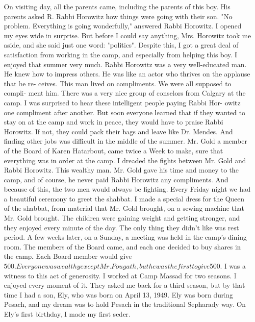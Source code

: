  
On visiting day, all the parents came, including the parents of 
this boy.
His parents asked R. Rabbi Horowitz how things were going with their son.
"No problem.
Everything is going wonderfully," answered Rabbi Horowitz.
I opened my eyes wide in surprise.
But before I could say anything, Mrs.
Horowitz took me aside, and she said just one word: "politics".
Despite this, I got a great deal of satisfaction from working in 
the camp, and especially from helping this boy.
I enjoyed that summer 
very much.
Rabbi Horowitz was a very well-educated man.
He knew how to impress 
others.
He was like an actor who thrives on the applause that he re-
ceives.
This man lived on compliments.
We were all supposed to compli-
ment him.
There was a very nice group of conselors from Calgary at the camp.
I was surprised to hear these intelligent people paying Rabbi Hor-
owitz one compliment after another.
But soon everyone learned that if 
they wanted to stay on at the camp and work in peace, they would have to 
praise Rabbi Horowitz.
If not, they could pack their bags and leave like 
Dr.
Mendes.
And finding other jobs was difficult in the middle of the 
summer.
Mr.
Gold a member of the Board of Karen Hatarbout, came twice a 
Week to make, sure that everything was in order at the camp.
I dreaded 
the fights between Mr.
Gold and Rabbi Horowitz.
This wealthy man.
Mr.
Gold gave his time and money to the camp, and of course, he never 
paid Rabbi Horowitz any compliments.
And because of this, the two men 
would always be fighting.
Every Friday night we had a beautiful ceremony to greet the shabbat.
I made a special dress for the Queen of the shabbat, from material that 
Mr.
Gold brought, on a sewing machine that Mr.
Gold brought.
The children were gaining weight and getting stronger, and they enjoyed every minute of the day.
The only thing they didn't like was rest period.
A few weeks later, on a Sunday, a meeting was held in the camp's 
dining room.
The members of the Board came, and each one decided to 
buy shares in the camp.
Each Board member would give $500.
Everyone 
was wealthy except Mr.
Pougath, but he was the first to give $500.
I 
was a witness to this act of generosity.
I worked at Camp Massad for two seasons.
I enjoyed every moment 
of it.
They asked me back for a third season, but by that time I had 
a son, Ely, who was born on April 13, 1949.
Ely was born during Pesach, and my dream was to hold Pesach in the 
traditional Sepharady way.
On Ely's first birthday, I made my first 
seder.
